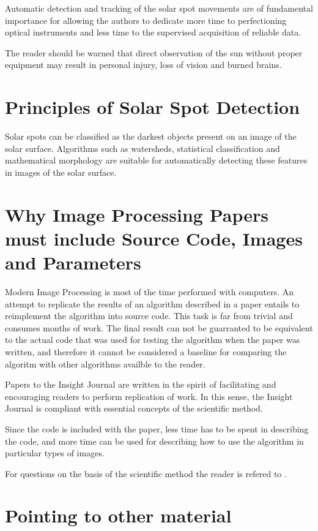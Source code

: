 \documentclass{InsightArticle}
\begin{document}
Automatic detection and tracking of the solar spot movements are of fundamental
importance for allowing the authors to dedicate more time to perfectioning
optical instruments and less time to the supervised acquisition of reliable
data.

The reader should be warned that direct observation of the sun without proper
equipment may result in personal injury, loss of vision and burned brains.

\section{Principles of Solar Spot Detection}

Solar spots can be classified as the darkest objects present on an image of the
solar surface. Algorithms such as watersheds, statistical classification and
mathematical morphology are suitable for automatically detecting these features
in images of the solar surface.


\section{Why Image Processing Papers must include Source Code, Images and Parameters }

Modern Image Processing is most of the time performed with computers. An
attempt to replicate the results of an algorithm described in a paper entails
to reimplement the algorithm into source code. This task is far from trivial
and consumes months of work. The final result can not be guarranted to be
equivalent to the actual code that was used for testing the algorithm when the
paper was written, and therefore it cannot be considered a baseline for
comparing the algoritm with other algorithms availble to the reader.

Papers to the Insight Journal are written in the spirit of facilitating and
encouraging readers to perform replication of work. In this sense, the Insight
Journal is compliant with essential concepts of the scientific method.

Since the code is included with the paper, less time has to be spent in
describing the code, and more time can be used for describing how to use the
algorithm in particular types of images.

For questions on the basis of the scientific method the reader is refered to
\cite{Popper2002,Popper1971}.



\section{Pointing to other material}
\end{document}
